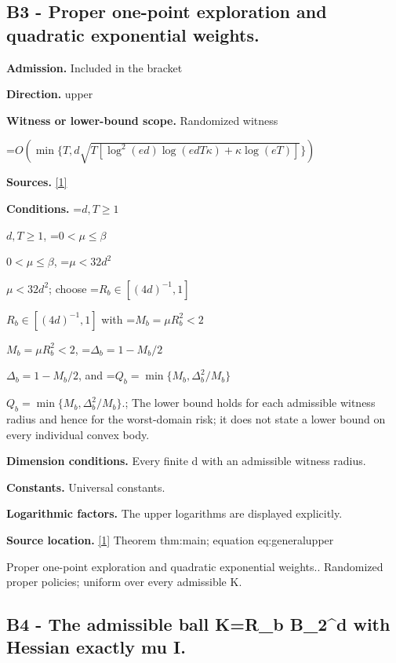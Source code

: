 \documentclass[10pt,a4paper]{article}
\newcommand{\AtlasMath}[1]{\par\begingroup\centering\setbox0=\hbox{$\displaystyle #1$}\ifdim\wd0>1.4\linewidth\typeout{ATLAS WIDE FORMULA: \the\wd0}\fi\ifdim\wd0>\linewidth\resizebox{\linewidth}{!}{\box0}\else\box0\fi\par\endgroup}
\newcommand{\AtlasInlineMath}[1]{\begingroup\setbox0=\hbox{$#1$}\ifdim\wd0>.4\linewidth\endgroup\AtlasMath{#1}\else\endgroup$#1$\fi}
\begin{document}
\subsection{B3 - Proper one-point exploration and quadratic exponential weights.}


\textbf{Admission.} Included in the bracket



\textbf{Direction.} upper



\textbf{Witness or lower-bound scope.} Randomized witness



\AtlasMath{O\!\left(\min\{T,d\sqrt{T[\log^2(ed)\log(edT\kappa)+\kappa\log(eT)]}\}\right)}


\textbf{Sources.} \href{https://github.com/WU-Wendao/Colombo/blob/main/colombo_sensorium/Complexity_altas/data/sources/colombo/U01/manuscript.pdf}{[1]}



\textbf{Conditions.} \AtlasInlineMath{d,T\ge1}, \AtlasInlineMath{0<\mu\le\beta}, \AtlasInlineMath{\mu<32d^2}; choose \AtlasInlineMath{R_b\in[(4d)^{-1},1]} with \AtlasInlineMath{M_b=\mu R_b^2<2}, \AtlasInlineMath{\Delta_b=1-M_b/2}, and \AtlasInlineMath{Q_b=\min\{M_b,\Delta_b^2/M_b\}}.; The lower bound holds for each admissible witness radius and hence for the worst-domain risk; it does not state a lower bound on every individual convex body.



\textbf{Dimension conditions.} Every finite d with an admissible witness radius.



\textbf{Constants.} Universal constants.



\textbf{Logarithmic factors.} The upper logarithms are displayed explicitly.



\textbf{Source location.} \href{https://github.com/WU-Wendao/Colombo/blob/main/colombo_sensorium/Complexity_altas/data/sources/colombo/U01/manuscript.pdf}{[1]} Theorem thm:main; equation eq:generalupper



Proper one-point exploration and quadratic exponential weights.. Randomized proper policies; uniform over every admissible K.



\subsection{B4 - The admissible ball K=R\_b B\_2\textasciicircum{}d with Hessian exactly mu I.}
\end{document}
